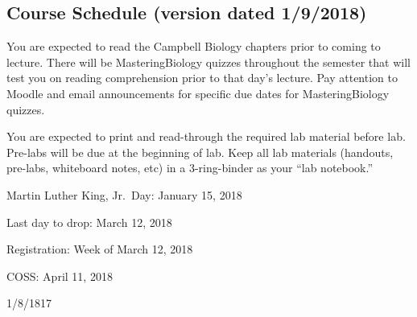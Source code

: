\documentclass{tufte-handout}
\begin{document}
\begin{fullwidth}
\newpage
\section{Course Schedule (version dated 1/9/2018)}
%

 You are expected to read the Campbell Biology chapters prior to coming to lecture.  There will be MasteringBiology quizzes throughout the semester that will test you on reading comprehension prior to that day's lecture. Pay attention to Moodle and email announcements for specific due dates for MasteringBiology quizzes.

 You are expected to print and read-through the required lab material before lab. Pre-labs will be due at the beginning of lab. Keep all lab materials (handouts, pre-labs, whiteboard notes, etc) in a 3-ring-binder as your ``lab notebook.'' 


Martin Luther King, Jr.\ Day: January 15, 2018

Last day to drop: March 12, 2018

Registration: Week of March 12, 2018

COSS: April 11, 2018

  \setlength{\calwidth}{6.5in}
  \setlength{\calboxdepth}{0.3in}
  \begin{calendar}{1/8/18}{17}

 \skipday%
  \calday[Tuesday]{\classday} %
 \skipday%
  \calday[Thursday]{\classday} %
    \skipday\skipday %
    \skipday




\end{calendar}
\end{fullwidth}
\end{document}
